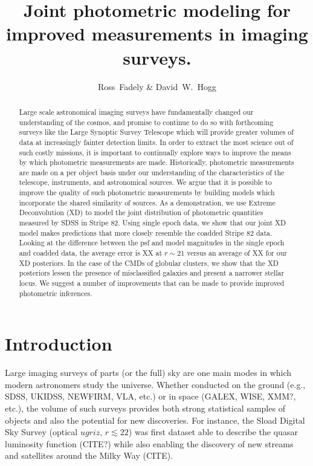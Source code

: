 \documentclass[12pt,preprint]{aastex}
\begin{document}
\title{Joint photometric modeling for improved measurements in imaging
surveys.}
\author{Ross~Fadely \&
        David~W.~Hogg}


%
%
\begin{abstract}
Large scale astronomical imaging surveys have fundamentally changed our 
understanding of the cosmos, and promise to continue to do so with forthcoming 
surveys like the Large Synoptic Survey Telescope which will provide greater 
volumes of data at increasingly fainter detection limits.  In order to extract
the most science out of such costly missions, it is important to continually
explore ways to improve the means by which photometric measurements are made.
Historically, photometric measurements are made on a per object basis under
our understanding of the characteristics of the telescope, instruments, and
astronomical sources.  We argue that it is possible to improve the quality of
such photometric measurements by building models which incorporate the shared
similarity of sources.  As a demonstration, we use Extreme Deconvolution (XD)
to model the joint distribution of photometric quantities measured by SDSS in
Stripe 82.  Using single epoch data, we show that our joint XD model makes
predictions that more closely resemble the coadded Stripe 82 data.  Looking
at the difference between the psf and model magnitudes in the single epoch and 
coadded data, the average error is XX at $r\sim21$ versus an average of XX
for our XD posteriors.  In the case of the CMDs of globular clusters, we show
that the XD posteriors lessen the presence of misclassified galaxies and
present a narrower stellar locus.  We suggest a number of improvements that
can be made to provide improved photometric inferences.
\end{abstract}

%
%
\section{Introduction}

Large imaging surveys of parts (or the full) sky are one main modes in which
modern astronomers study the universe.  Whether conducted on the ground (e.g.,
SDSS, UKIDSS, NEWFIRM, VLA, etc.) or in space (GALEX, WISE, XMM?, etc.), the
volume of such surveys provides both strong statistical samples of objects and
also the potential for new discoveries.  For instance, the Sload Digital Sky
Survey (optical $ugriz$, $r\lesssim 22$) \citep{york00} was first dataset able
to describe the quasar luminosity function (CITE?) while also enabling the 
discovery of new streams and satellites around the Milky Way (CITE).
\end{document}
